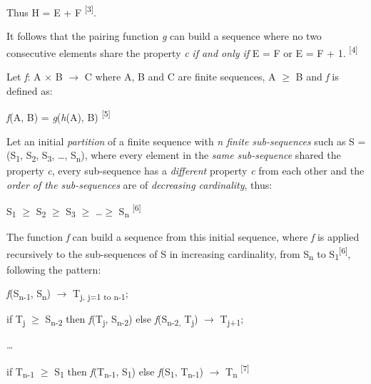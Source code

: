 \documentclass[12pt]{article}
\begin{document}
Thus \textbar{}H\textbar{} = \textbar{}E\textbar{} + \textbar{}F\textbar{} 
\textsuperscript{[3]}.

It follows that the pairing function \textit{g} can build a sequence where no 
two consecutive elements share the property \textit{c} \textit{if and only if} 
\textbar{}E\textbar{} = \textbar{}F\textbar{} or \textbar{}E\textbar{} = \textbar{}F\textbar{} 
+ 1. \textsuperscript{[4]}

Let \textit{f}: A \ensuremath{\times} B $\rightarrow$ C where A, B and C are finite sequences, 
\textbar{}A\textbar{} $\geq$ \textbar{}B\textbar{} and \textit{f} is defined as:

\begin{center}
\textit{f}(A, B) = \textit{g}(\textit{h}(A), B) \textsuperscript{[5]}
\end{center}

Let an initial \textit{partition} of a finite sequence with \textit{n finite sub-sequences} such as S = (S\textsubscript{1}, S\textsubscript{2}, S\textsubscript{3}, \ldots, S\textsubscript{n}), where every element in the \textit{same sub-sequence} shared the property \textit{c}, every sub-sequence has a \textit{different} property \textit{c} from each other and the \textit{order 
of the sub-sequences} are of \textit{decreasing cardinality}, 
thus:

\begin{center}
\textbar{}S\textsubscript{1}\textbar{} 	$\geq$ \textbar{}S\textsubscript{2}\textbar{} $\geq$ \textbar{}S\textsubscript{3}\textbar{} $\geq$ \ldots $\geq$ \textbar{}S\textsubscript{n}\textbar{} \textsuperscript{[6]}
\end{center}

The function \textit{f} can build a sequence from this initial sequence, where \textit{f 
}is applied recursively to the sub-sequences of S in increasing cardinality, from S\textsubscript{n} 
to S\textsubscript{1}\textsuperscript{[6]}, following the pattern:

\begin{center}
\textit{f}(S\textsubscript{n-1}, S\textsubscript{n}) $\rightarrow$ T\textsubscript{j, j=1 
to n-1};
\end{center}
\begin{center}
if \textbar{}T\textsubscript{j}\textbar{} $\geq$ \textbar{}S\textsubscript{n-2}\textbar{} 
then \textit{f}(T\textsubscript{j}, S\textsubscript{n-2}) else \textit{f}(S\textsubscript{n-2, 
}T\textsubscript{j}) $\rightarrow$ T\textsubscript{j+1};
\end{center}
\begin{center}
\ldots
\end{center}
\begin{center}
if \textbar{}T\textsubscript{n-1}\textbar{} $\geq$ \textbar{}S\textsubscript{1}\textbar{} then \textit{f}(T\textsubscript{n-1}, S\textsubscript{1}) else \textit{f}(S\textsubscript{1}, T\textsubscript{n-1}) $\rightarrow$ T\textsubscript{n} \textsuperscript{[7]}
\end{center}
\end{document}
